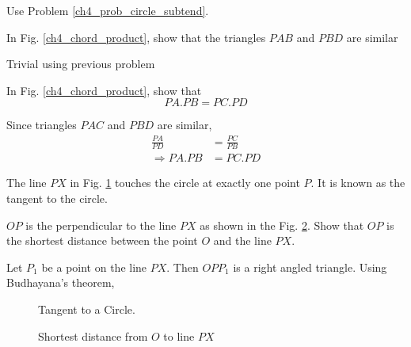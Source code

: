 %
%
\proof Use Problem \ref{ch4_prob_circle_subtend}.
%
\begin{problem}
	In Fig. \ref{ch4_chord_product}, show that the triangles $PAB$ and $PBD$ are similar
\end{problem}
\proof Trivial using previous problem
\begin{problem}
	In Fig. \ref{ch4_chord_product}, show that 
	\begin{equation}
	PA.PB = PC.PD
	\end{equation}
\end{problem}
%
\proof Since triangles $PAC$ and $PBD$ are similar, 
%
\begin{align}
\frac{PA}{PD} &= \frac{PC}{PB} \\
\Rightarrow PA.PB &= PC.PD
\end{align}
%
%
\begin{definition}
	The line $PX$ in Fig. \ref{ch4_tangent_def} touches the circle at exactly one  point $P$. It is known as the tangent to the circle.
\end{definition}
%
%
\begin{problem}
	$OP$ is the perpendicular to the line $PX$ as shown in the Fig. \ref{ch4_short_dist}. Show that $OP$ is the shortest distance between the point $O$ and the line $PX$. 
\end{problem}
\proof Let $P_1$ be a point on the line $PX$. Then $OPP_1$ is a right angled triangle.  Using Budhayana's theorem,
%
\begin{figure}[!h]
	\begin{center}
		
		\resizebox{\columnwidth}{!}{}
	\end{center}
	\caption{Tangent to a Circle.}
	\label{ch4_tangent_def}	
\end{figure}
%
\begin{figure}[!h]
	\begin{center}
		
		\resizebox{\columnwidth}{!}{}
	\end{center}
	\caption{Shortest distance from $O$ to line $PX$}
	\label{ch4_short_dist}	
\end{figure}

